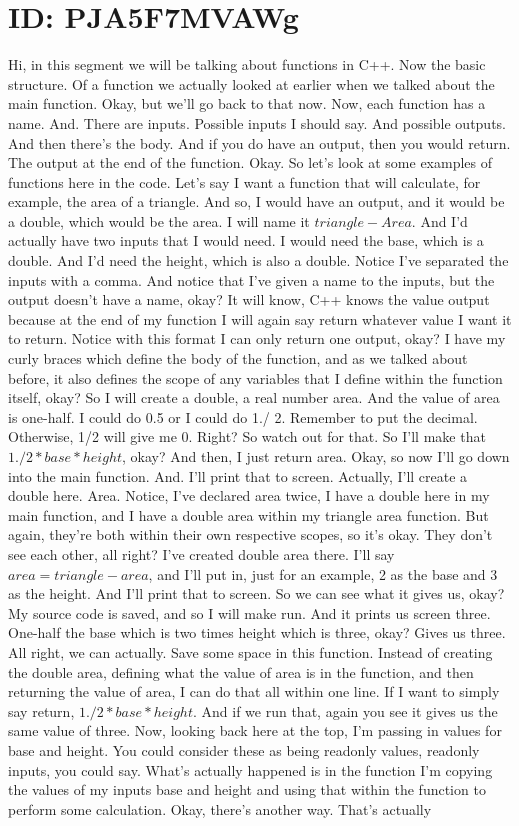 \documentclass[10pt]{article}
\begin{document}
\section*{ID: PJA5F7MVAWg}
Hi, in this segment we will be talking about functions in C++. Now the basic structure. Of a function we actually looked at earlier when we talked about the main function. Okay, but we'll go back to that now. Now, each function has a name. And. There are inputs. Possible inputs I should say. And possible outputs. And then there's the body. And if you do have an output, then you would return. The output at the end of the function. Okay. So let's look at some examples of functions here in the code. Let's say I want a function that will calculate, for example, the area of a triangle. And so, I would have an output, and it would be a double, which would be the area. I will name it $triangle-Area$. And I'd actually have two inputs that I would need. I would need the base, which is a double. And I'd need the height, which is also a double. Notice I've separated the inputs with a comma. And notice that I've given a name to the inputs, but the output doesn't have a name, okay? It will know, C++ knows the value output because at the end of my function I will again say return whatever value I want it to return. Notice with this format I can only return one output, okay? I have my curly braces which define the body of the function, and as we talked about before, it also defines the scope of any variables that I define within the function itself, okay? So I will create a double, a real number area. And the value of area is one-half. I could do 0.5 or I could do 1./ 2. Remember to put the decimal. Otherwise, 1/2 will give me 0. Right? So watch out for that. So I'll make that $1./ 2*base*height$, okay? And then, I just return area. Okay, so now I'll go down into the main function. And. I'll print that to screen. Actually, I'll create a double here. Area. Notice, I've declared area twice, I have a double here in my main function, and I have a double area within my triangle area function. But again, they're both within their own respective scopes, so it's okay. They don't see each other, all right? I've created double area there. I'll say $area = triangle-area$, and I'll put in, just for an example, 2 as the base and 3 as the height. And I'll print that to screen. So we can see what it gives us, okay? My source code is saved, and so I will make run. And it prints us screen three. One-half the base which is two times height which is three, okay? Gives us three. All right, we can actually. Save some space in this function. Instead of creating the double area, defining what the value of area is in the function, and then returning the value of area, I can do that all within one line. If I want to simply say return, $1./2*base*height$. And if we run that, again you see it gives us the same value of three. Now, looking back here at the top, I'm passing in values for base and height. You could consider these as being readonly values, readonly inputs, you could say. What's actually happened is in the function I'm copying the values of my inputs base and height and using that within the function to perform some calculation. Okay, there's another way. That's actually 
\end{document}
